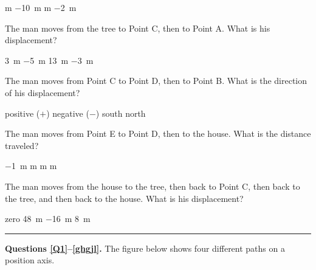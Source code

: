 \documentclass[answers]{exam}
\begin{document}
\begin{questions}
\begin{choices}
 m
\choice \SI{-10}{m}
 m
\choice \SI{-2}{m}
\end{choices}

\question
The man moves from the tree to Point C, then to Point A. What is his displacement?

\begin{choices}
\CorrectChoice \SI{3}{m}
\choice \SI{-5}{m}
\choice \SI{13}{m}
\choice \SI{-3}{m}
\end{choices}

\question
The man moves from Point C to Point D, then to Point B. What is the direction of his displacement?

\begin{choices}
\choice positive ($+$)
\CorrectChoice negative ($-$)
\choice south
\choice north
\end{choices}

\question
The man moves from Point E to Point D, then to the house. What is the distance traveled?

\begin{choices}
\choice \SI{-1}{m}
 m
 m
 m
\end{choices}


\question \label{KIWye}
The man moves from the house to the tree, then back to Point C, then back to the tree, and then back to the house. What is his displacement?

\begin{choices}
\CorrectChoice zero
\choice \SI{48}{m}
\choice \SI{-16}{m}
\choice \SI{8}{m}
\end{choices}

\bigskip

\hrule

\begin{EnvUplevel}
    
\textbf{Questions \ref{Q1}--\ref{ghgjl}.} The figure below shows four different paths on a position axis.

\begin{center}
\end{center}
\end{EnvUplevel}




\end{questions}
\end{document}
